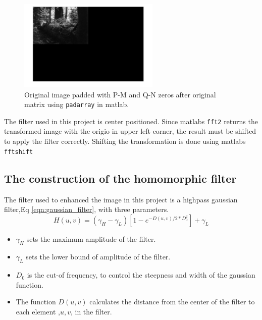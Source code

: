 \begin{figure}[h!]
  \begin{center}
    \includegraphics[width=0.6\textwidth]{pics/zeroPadded.png}
  \end{center}
  \caption{Original image padded with P-M and Q-N zeros after original matrix using \verb~padarray~ in matlab.}
  \label{fig:zeropadded}    
\end{figure}

The filter used in this project is center positioned. Since matlabs \verb~fft2~ returns the transformed image with the origio in upper left corner, the result must be shifted to apply the filter correctly. Shifting the transformation is done using matlabs \verb~fftshift~

\subsection{The construction of the homomorphic filter}
The filter used to enhanced the image in this project is a highpass gaussian filter,Eq \ref{eqn:gaussian_filter}, with three parameters. 
    \begin{equation}
    \label{eqn:gaussian_filter}
      H(u,v) = \left( \gamma_H - \gamma_L \right) \left[ 1 - e^{- D(u,v) /2 * D_0^2}\right] + \gamma_L 
    \end{equation}

\begin{itemize}
  \item $\gamma_H$ sets the maximum amplitude of the filter.
  \item $\gamma_L$ sets the lower bound of amplitude of the filter.
  \item $D_0$ is the cut-of frequency, to control the steepness and width of the gaussian function.
  \item The function $D(u,v)$ calculates the distance from the center of the filter to each element ,$u,v$, in the filter.  
\end{itemize}


